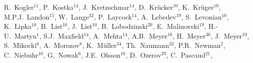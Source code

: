 \documentclass[12pt]{article}
\begin{document}
\begin{flushleft}
R.~Kogler$^{11}$,              %
P.~Kostka$^{14}$,              %
J.~Kretzschmar$^{14}$,         %
D.~Kr\"ucker$^{10}$,           %
K.~Kr\"uger$^{10}$,            %
M.P.J.~Landon$^{15}$,          %
W.~Lange$^{32}$,               %
P.~Laycock$^{14}$,             %
A.~Lebedev$^{19}$,             %
S.~Levonian$^{10}$,            %
K.~Lipka$^{10}$,               %
B.~List$^{10}$,                %
J.~List$^{10}$,                %
B.~Lobodzinski$^{20}$,         %
E.~Malinovski$^{19}$,          %
H.-U.~Martyn$^{1}$,            %
S.J.~Maxfield$^{14}$,          %
A.~Mehta$^{14}$,               %
A.B.~Meyer$^{10}$,             %
H.~Meyer$^{30}$,               %
J.~Meyer$^{10}$,               %
S.~Mikocki$^{6}$,              %
A.~Morozov$^{8}$,              %
K.~M\"uller$^{34}$,            %
Th.~Naumann$^{32}$,            %
P.R.~Newman$^{2}$,             %
C.~Niebuhr$^{10}$,             %
G.~Nowak$^{6}$,                %
J.E.~Olsson$^{10}$,            %
D.~Ozerov$^{29}$,              %
C.~Pascaud$^{21}$,             %

\end{flushleft}
\end{document}
